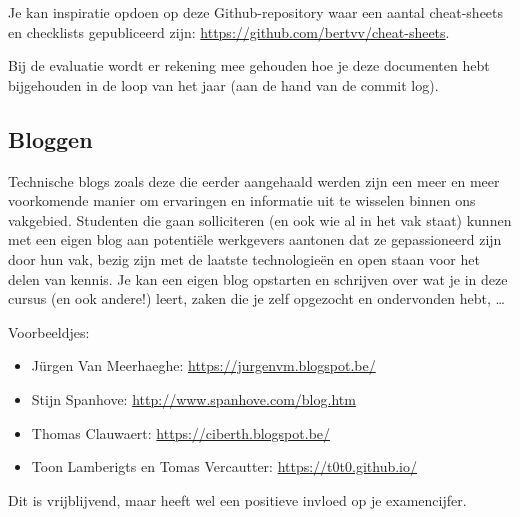 Je kan inspiratie opdoen op deze Github-repository waar een aantal cheat-sheets en checklists gepubliceerd zijn: \url{https://github.com/bertvv/cheat-sheets}.

Bij de evaluatie wordt er rekening mee gehouden hoe je deze documenten hebt bijgehouden in de loop van het jaar (aan de hand van de commit log).

\subsection{Bloggen}%
\label{subs:bloggen}

Technische blogs zoals deze die eerder aangehaald werden zijn een meer en meer voorkomende manier om ervaringen en informatie uit te wisselen binnen ons vakgebied. Studenten die gaan solliciteren (en ook wie al in het vak staat) kunnen met een eigen blog aan potentiële werkgevers aantonen dat ze gepassioneerd zijn door hun vak, bezig zijn met de laatste technologieën en open staan voor het delen van kennis. Je kan een eigen blog opstarten en schrijven over wat je in deze cursus (en ook andere!) leert, zaken die je zelf opgezocht en ondervonden hebt, \ldots

Voorbeeldjes:

\begin{itemize}
\item Jürgen Van Meerhaeghe: \url{https://jurgenvm.blogspot.be/}
\item Stijn Spanhove: \url{http://www.spanhove.com/blog.htm}
\item Thomas Clauwaert: \url{https://ciberth.blogspot.be/}
\item Toon Lamberigts en Tomas Vercautter: \url{https://t0t0.github.io/}
\end{itemize}

Dit is vrijblijvend, maar heeft wel een positieve invloed op je examencijfer.

